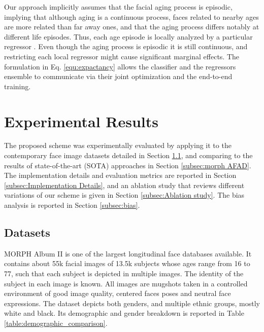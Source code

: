 \documentclass[10pt,twocolumn,letterpaper]{article}
\begin{document}
Our approach implicitly assumes that the facial aging process is episodic,
implying that although aging is a continuous process, faces related to
nearby ages are more related than far away ones, and that the aging process
differs notably at different life episodes. Thus, each age episode is
locally analyzed by a particular regressor . Even though the aging process is episodic it is still continuous,
and restricting each local regressor  might cause significant marginal effects. The formulation in Eq. \ref{equ:expactancy} allows the classifier and the regressors ensemble  to
communicate via their joint optimization and the end-to-end training.

\section{Experimental Results}

\label{sec:Experiments}

The proposed scheme was experimentally evaluated by applying it to the
contemporary face image datasets detailed in Section \ref{subsec:dataset},
and comparing to the results of state-of-the-art (SOTA) approaches in
Section \ref{subsec:morph AFAD}. The implementation details and evaluation
metrics are reported in Section \ref{subsec:Implementation Details}, and an
ablation study that reviews different variations of our scheme is given in
Section \ref{subsec:Ablation study}. The bias analysis is reported in
Section \ref{subsec:bias}.

\subsection{Datasets}

\label{subsec:dataset}

MORPH Album II \cite{1613043} is one of the largest longitudinal face
databases available. It contains about 55k facial images of 13.5k subjects
whose ages range from 16 to 77, such that each subject is depicted in
multiple images. The identity of the subject in each image is known. All
images are mugshots taken in a controlled environment of good image quality,
centered faces poses and neutral face expressions. The dataset depicts both
genders, and multiple ethnic groups, mostly white and black. Its demographic
and gender breakdown is reported in Table \ref{table:demographic_comparison}.
\end{document}
